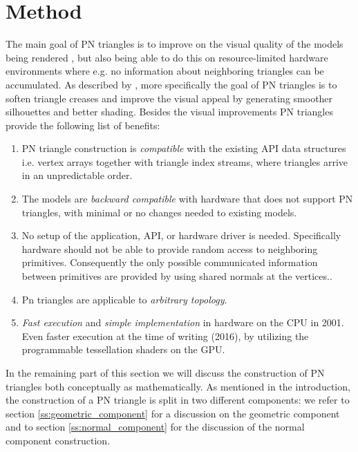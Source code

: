
\section{Method}
\label{s:method}


The main goal of PN triangles is to improve on the visual quality of the models being rendered , but also being able to do this on resource-limited hardware environments where e.g. no information about neighboring triangles can be accumulated. As described by \citeauthor{vlachos2001curved}, more specifically the goal of PN triangles is to soften triangle creases and improve the visual appeal by generating smoother silhouettes and better shading. Besides the visual improvements PN triangles provide the following list of benefits:

\begin{enumerate}
 	\item PN triangle construction is \textit{compatible} with the existing API data structures i.e. vertex arrays together with triangle index streams, where triangles arrive in an unpredictable order.
 	\item The models are \textit{backward compatible} with hardware that does not support PN triangles, with minimal or no changes needed to existing models.
 	\item No setup of the application, API, or hardware driver is needed. Specifically hardware should not be able to provide random access to neighboring primitives. Consequently the only possible communicated information between primitives are provided by using shared normals at the vertices..
 	\item Pn triangles are applicable to \textit{arbitrary topology}.
 	\item \textit{Fast execution} and \textit{simple implementation} in hardware on the CPU in 2001. Even faster execution at the time of writing (2016), by utilizing the programmable tessellation shaders on the GPU.
 \end{enumerate} 

In the remaining part of this section we will discuss the construction of PN triangles both conceptually as mathematically. As mentioned in the introduction, the construction of a PN triangle is split in two different components: we refer to section \ref{ss:geometric_component} for a discussion on the geometric component and to section \ref{ss:normal_component} for the discussion of the normal component construction.

